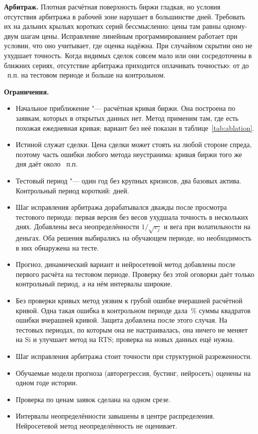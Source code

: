 \documentclass{article}
\begin{document}
\textbf{Арбитраж.} Плотная расчётная поверхность биржи гладкая, но условия отсутствия арбитража в рабочей зоне нарушает в большинстве дней. Требовать их на дальних крыльях коротких серий бессмысленно: цены там равны одному-двум шагам цены. Исправление линейным программированием работает при условии, что оно учитывает, где оценка надёжна. При случайном скрытии оно не ухудшает точность. Когда видимых сделок совсем мало или они сосредоточены в ближних сериях, отсутствие арбитража приходится оплачивать точностью: от  до ~п.п. на тестовом периоде и больше на контрольном.

\textbf{Ограничения.}
\begin{itemize}
    \item Начальное приближение "--- расчётная кривая биржи. Она построена по заявкам, которых в открытых данных нет. Метод применим там, где есть похожая ежедневная кривая; вариант без неё показан в таблице~\ref{tab:ablation}.
    \item Истиной служат сделки. Цена сделки может стоять на любой стороне спреда, поэтому часть ошибки любого метода неустранима: кривая биржи того же дня даёт около ~п.п.
    \item Тестовый период "--- один год без крупных кризисов, два базовых актива. Контрольный период короткий:  дней.
    \item Шаг исправления арбитража дорабатывался дважды после просмотра тестового периода: первая версия без весов ухудшала точность в нескольких днях. Добавлены веса неопределённости $1/\sqrt{v_j}$ и вега при волатильности на деньгах. Оба решения выбирались на обучающем периоде, но необходимость в них обнаружена на тесте.
    \item Прогноз, динамический вариант и нейросетевой метод добавлены после первого расчёта на тестовом периоде. Проверку без этой оговорки даёт только контрольный период, а на нём интервалы широкие.
    \item Без проверки кривых метод уязвим к грубой ошибке вчерашней расчётной кривой. Одна такая ошибка в контрольном периоде дала \,\% суммы квадратов ошибки вчерашней кривой. Защита добавлена после этого случая. На тестовых периодах, по которым она не настраивалась, она ничего не меняет на Si и улучшает метод на RTS; проверка на новых данных ещё нужна.
    \item Шаг исправления арбитража стоит точности при структурной разреженности.
    \item Обучаемые модели прогноза (авторегрессия, бустинг, нейросеть) оценены на одном годе истории.
    \item Проверка по ценам заявок сделана на одном срезе.
    \item Интервалы неопределённости завышены в центре распределения. Нейросетевой метод неопределённость не оценивает.
\end{itemize}
\end{document}
